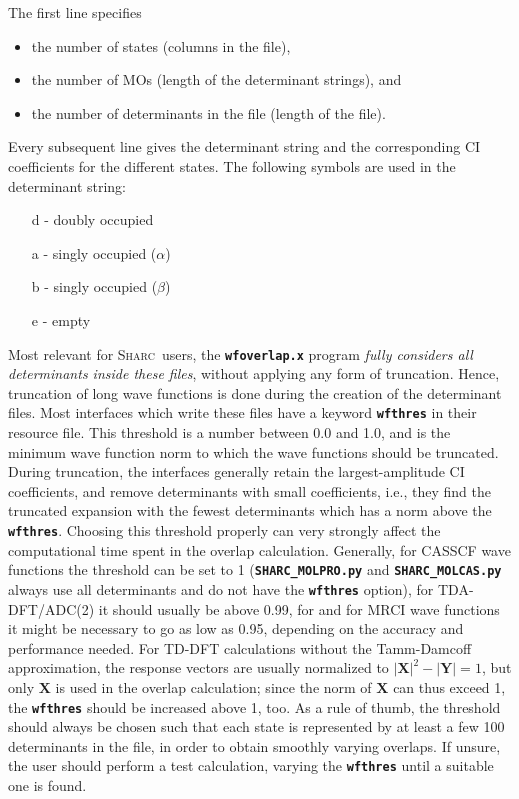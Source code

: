 \documentclass[a4paper,10pt,DIV=15,openany,twoside=false]{scrbook}
\newcommand{\sharc}{\textsc{Sharc}}
\newcommand{\ttt}[1]{\textbf{\texttt{#1}}}
\begin{document}
The first line specifies
%
\begin{itemize}
\item the number of states (columns in the file),
\item the number of MOs (length of the determinant strings), and
\item the number of determinants in the file (length of the file).
\end{itemize}

Every subsequent line gives the determinant string and the corresponding CI coefficients for the different states.
The following symbols are used in the determinant string:

\begin{itemize}
\item[d] - doubly occupied
\item[a] - singly occupied ($\alpha$)
\item[b] - singly occupied ($\beta$)
\item[e] - empty
\end{itemize}

Most relevant for \sharc\ users, the \ttt{wfoverlap.x} program \emph{fully considers all determinants inside these files}, without applying any form of truncation. Hence, truncation of long wave functions is done during the creation of the determinant files.
Most interfaces which write these files have a keyword \ttt{wfthres} in their resource file. This threshold is a number between 0.0 and 1.0, and is the minimum wave function norm to which the wave functions should be truncated. During truncation, the interfaces generally retain the largest-amplitude CI coefficients, and remove determinants with small coefficients, i.e., they find the truncated expansion with the fewest determinants which has a norm above the \ttt{wfthres}.
Choosing this threshold properly can very strongly affect the computational time spent in the overlap calculation. Generally, for CASSCF wave functions the threshold can be set to 1 (\ttt{SHARC\_MOLPRO.py} and \ttt{SHARC\_MOLCAS.py} always use all determinants and do not have the \ttt{wfthres} option), for TDA-DFT/ADC(2) it should usually be above 0.99, for and for MRCI wave functions it might be necessary to go as low as 0.95, depending on the accuracy and performance needed.
For TD-DFT calculations without the Tamm-Damcoff approximation, the response vectors are usually normalized to $|\mathbf{X}|^2-|\mathbf{Y}|=1$, but only $\mathbf{X}$ is used in the overlap calculation; since the norm of $\mathbf{X}$ can thus exceed 1, the \ttt{wfthres} should be increased above 1, too.
As a rule of thumb, the threshold should always be chosen such that each state is represented by at least a few 100 determinants in the file, in order to obtain smoothly varying overlaps.
If unsure, the user should perform a test calculation, varying the \ttt{wfthres} until a suitable one is found.
\end{document}
